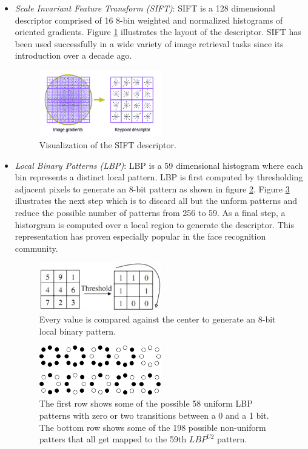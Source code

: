 \documentclass[12pt]{article}
\begin{document}
\begin{itemize}
\item \textit{Scale Invariant Feature Transform (SIFT)}:
SIFT \cite{lowe04} is a 128 dimensional descriptor comprised of 16 8-bin weighted and normalized histograms of oriented gradients.
Figure \ref{fig:SIFT} illustrates the layout of the descriptor.
SIFT has been used successfully in a wide variety of image retrieval tasks since its introduction over a decade ago.

\begin{figure}
\centering
\includegraphics[width = 0.5\textwidth]{SIFT}
\caption{Visualization of the SIFT descriptor.}
\label{fig:SIFT}
\end{figure}

\item \textit{Local Binary Patterns (LBP)}:
LBP \cite{ahonen06} is a 59 dimensional histogram where each bin represents a distinct local pattern.
LBP is first computed by thresholding adjacent pixels to generate an 8-bit pattern as shown in figure \ref{fig:lbp}.
Figure \ref{fig:lbpu2} illustrates the next step which is to discard all but the unform patterns and reduce the possible number of patterns from 256 to 59.
As a final step, a historgram is computed over a local region to generate the descriptor.
This representation has proven especially popular in the face recognition community.

\begin{figure}
\centering
\includegraphics[width = 0.5\textwidth]{LBPSimple}
\caption{Every value is compared against the center to generate an 8-bit local binary pattern.}
\label{fig:lbp}
\end{figure}

\begin{figure}
\centering
\includegraphics[width = 0.5\textwidth]{LBPU2}
\caption{
The first row shows some of the possible 58 uniform LBP patterns with zero or two transitions between a 0 and a 1 bit.
The bottom row shows some of the 198 possible non-uniform patters that all get mapped to the 59th $LBP^{U2}$ pattern.
}
\label{fig:lbpu2}
\end{figure}


\end{itemize}
\end{document}

